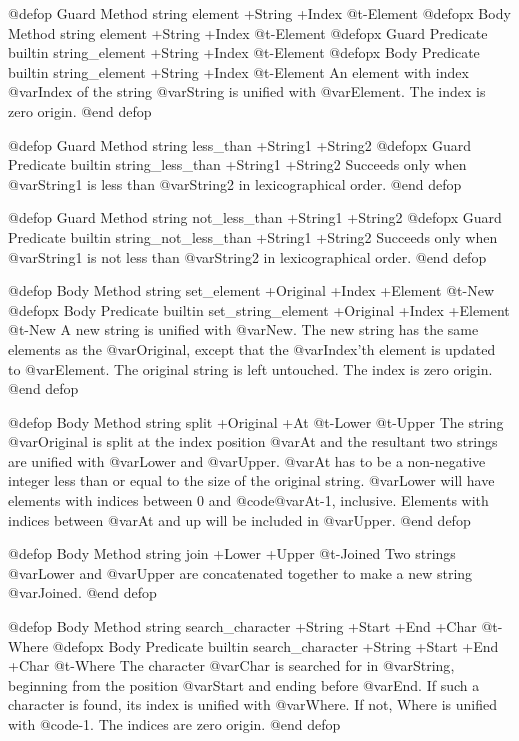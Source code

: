 {{{{@defop {Guard Method} string element +String +Index @t{-}Element
@defopx {Body Method} string element +String +Index @t{-}Element
@defopx {Guard Predicate} {builtin} string_element +String +Index @t{-}Element
@defopx {Body Predicate} {builtin} string_element +String +Index @t{-}Element
An element with index @var{Index} of the string @var{String} is unified
with @var{Element}.  The index is zero origin.
@end defop

@defop {Guard Method} string less_than +String1 +String2
@defopx {Guard Predicate} {builtin} string_less_than +String1 +String2
Succeeds only when @var{String1} is less than @var{String2} in
lexicographical order.
@end defop

@defop {Guard Method} string not_less_than +String1 +String2
@defopx {Guard Predicate} {builtin} string_not_less_than +String1 +String2
Succeeds only when @var{String1} is not less than @var{String2} in
lexicographical order.
@end defop

@defop {Body Method} string set_element +Original +Index +Element @t{-}New
@defopx {Body Predicate} {builtin} set_string_element +Original +Index +Element @t{-}New
A new string is unified with @var{New}.  The new string has the same
elements as the @var{Original}, except that the @var{Index}'th element
is updated to @var{Element}.  The original string is left untouched.
The index is zero origin.
@end defop

@defop {Body Method} string split +Original +At @t{-}Lower @t{-}Upper
The string @var{Original} is split at the index position @var{At} and
the resultant two strings are unified with @var{Lower} and @var{Upper}.
@var{At} has to be a non-negative integer less than or equal to the size
of the original string.  @var{Lower} will have elements with indices
between 0 and @code{@var{At}-1}, inclusive.  Elements with indices
between @var{At} and up will be included in @var{Upper}.
@end defop

@defop {Body Method} string join +Lower +Upper @t{-}Joined
Two strings @var{Lower} and @var{Upper} are concatenated together to
make a new string @var{Joined}.
@end defop

@defop {Body Method} string search_character +String +Start +End +Char @t{-}Where
@defopx {Body Predicate} {builtin} search_character +String +Start +End +Char @t{-}Where
The character @var{Char} is searched for in @var{String}, beginning from
the position @var{Start} and ending before @var{End}.  If such a
character is found, its index is unified with @var{Where}.  If not,
Where is unified with @code{-1}.  The indices are zero origin.
@end defop

}}}}
